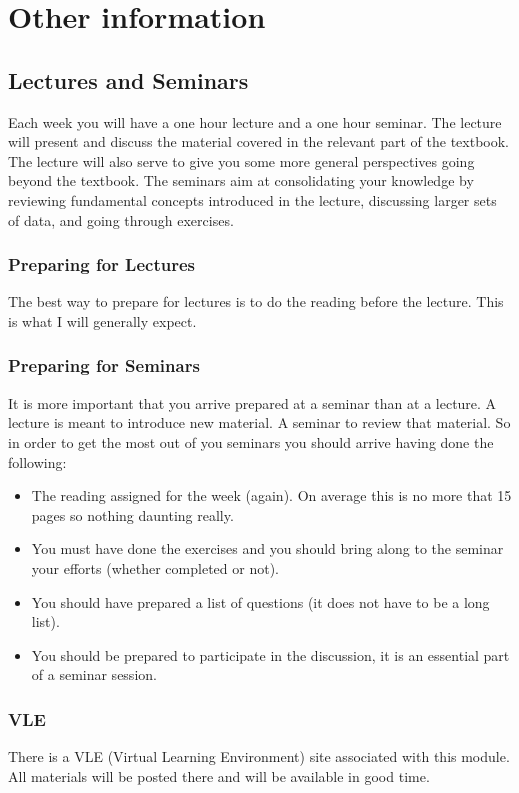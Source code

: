 \documentclass[12pt]{article}
\begin{document}
\section{Other information}


\subsection{Lectures and Seminars}
 Each week you will have a one hour lecture and a one hour seminar.  The lecture will present and discuss the material covered in the relevant part of the textbook.  The lecture will also serve to give you some more general perspectives going beyond the textbook.  The seminars aim at consolidating your knowledge by reviewing fundamental concepts introduced in the lecture, discussing larger sets of data, and going through exercises.

\subsubsection*{Preparing for Lectures}  The best way to prepare for lectures is to do the reading before the lecture.  This is what I will generally expect.

\subsubsection*{Preparing for Seminars} It is more important that you arrive prepared at a seminar than at a lecture.  A lecture is meant to introduce new material.  A seminar to review that material.  So in order to get the most out of you seminars you should arrive having done the following:
\begin{itemize}
\item The reading assigned for the week (again).  On average this is no more that 15 pages so nothing daunting really.
\item You must have done the exercises and you should bring along to the seminar your efforts (whether completed or not).
\item You should have prepared a list of questions (it does not have to be a long list). 
\item You should be prepared to participate in the discussion, it is an essential part of a seminar session.
\end{itemize}

\subsubsection*{VLE}
There is a VLE (Virtual Learning Environment) site associated with this module.  All materials will be posted there and will be available in good time.
\end{document}
